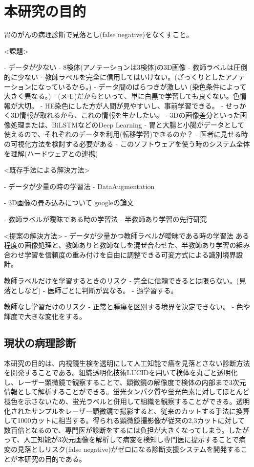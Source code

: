 \documentclass[a4j,10pt,oneside,openany]{jsbook}
\begin{document}
\chapter{本研究の目的}
胃のがんの病理診断で見落とし(false negative)をなくすこと。

<課題>

- データが少ない
    - 8検体(アノテーションは3検体)の3D画像
- 教師ラベルは圧倒的に少ない
- 教師ラベルを完全に信用してはいけない。(ざっくりとしたアノテーションになっているから。)
- データ間のばらつきが激しい (染色条件によって大きく異なる。)
    - (メモ)だからといって、単に白黒で学習しても良くない。色情報が大切。
    - HE染色にした方が人間が見やすいし、事前学習できる。
- せっかく3D情報が取れるから、これの情報を生かしたい。
    - 3Dの画像差分といった画像処理または、BiLSTMなどのDeep Learning
- 胃と大腸と小腸がデータとして使えるので、それぞれのデータを利用(転移学習)できるのか？
- 医者に見せる時の可視化方法を検討する必要がある
- このソフトウェアを使う時のシステム全体を理解(ハードウェアとの連携)

<既存手法による解決方法>

- データが少量の時の学習法
    - DataAugmentation
    
 - 3D画像の畳み込みについて
 googleの論文

- 教師ラベルが曖昧である時の学習法
    - 半教師あり学習の先行研究

<提案の解決方法>
- データが少量かつ教師ラベルが曖昧である時の学習法
ある程度の画像処理と、教師ありと教師なしを混ぜ合わせた、半教師あり学習の組み合わせ学習を信頼度の重み付けを自由に調整できる可変方式による識別境界設計。

教師ラベルだけを学習するときのリスク
    - 完全に信頼できるとは限らない。(見落としなど)
    - 医師ごとに判断が異なる。
    - 過学習する。
    
教師なし学習だけのリスク
    - 正常と腫瘍を区別する境界を決定できない。
    - 色や輝度で大きな変化をする。


\section{現状の病理診断}
本研究の目的は、内視鏡生検を透明にして人工知能で癌を見落とさない診断方法を開発することである。組織透明化技術LUCIDを用いて検体を丸ごと透明化し、レーザー顕微鏡で観察することで、顕微鏡の解像度で検体の内部まで3次元情報として解析することができる。蛍光タンパク質や蛍光色素に対してほとんど褪色を示さないため、蛍光ラベルと併用して組織を観察することができる。透明化されたサンプルをレーザー顕微鏡で撮影すると、従来のカットする手法に換算して1000カットに相当する。得られる顕微鏡撮影像が従来の2,3カットに対して数百倍となるので、専門医が診断をするには負担が大きくなってしまう。したがって、人工知能が3次元画像を解析して病変を検知し専門医に提示することで病変の見落としリスク(false negative)がゼロになる診断支援システムを開発することが本研究の目的である。
\end{document}
